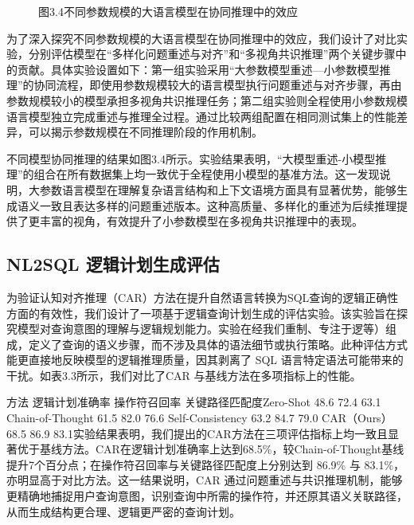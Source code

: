 \documentclass[12pt,a4paper,openright,UTF8]{ctexbook}
\begin{document}
\begin{figure}[htbp]
\centering
{}
\caption{图3.4不同参数规模的大语言模型在协同推理中的效应}
\end{figure}

为了深入探究不同参数规模的大语言模型在协同推理中的效应，我们设计了对比实验，分别评估模型在“多样化问题重述与对齐”和“多视角共识推理”两个关键步骤中的贡献。具体实验设置如下：第一组实验采用“大参数模型重述—小参数模型推理”的协同流程，即使用参数规模较大的语言模型执行问题重述与对齐步骤，再由参数规模较小的模型承担多视角共识推理任务；第二组实验则全程使用小参数规模语言模型独立完成重述与推理全过程。通过比较两组配置在相同测试集上的性能差异，可以揭示参数规模在不同推理阶段的作用机制。


不同模型协同推理的结果如图3.4所示。实验结果表明，“大模型重述-小模型推理”的组合在所有数据集上均一致优于全程使用小模型的基准方法。这一发现说明，大参数语言模型在理解复杂语言结构和上下文语境方面具有显著优势，能够生成语义一致且表达多样的问题重述版本。这种高质量、多样化的重述为后续推理提供了更丰富的视角，有效提升了小参数模型在多视角共识推理中的表现。

\subsection{NL2SQL 逻辑计划生成评估}

为验证认知对齐推理（CAR）方法在提升自然语言转换为SQL查询的逻辑正确性方面的有效性，我们设计了一项基于逻辑查询计划生成的评估实验。该实验旨在探究模型对查询意图的理解与逻辑规划能力。实验在经我们重制、专注于逻等）组成，定义了查询的语义步骤，而不涉及具体的语法细节或执行策略。此种评估方式能更直接地反映模型的逻辑推理质量，因其剥离了 SQL 语言特定语法可能带来的干扰。如表3.3所示，我们对比了CAR 与基线方法在多项指标上的性能。

\begin{table}[htbp]
\centering
\caption{表3.3不同方法在逻辑查询计划生成任务上的性能对比}
\end{table}

方法 逻辑计划准确率 操作符召回率 关键路径匹配度Zero-Shot 48.6 72.4 63.1 Chain-of-Thought 61.5 82.0 76.6 Self-Consistency 63.2 84.7 79.0 CAR（Ours） 68.5 86.9 83.1实验结果表明，我们提出的CAR方法在三项评估指标上均一致且显著优于基线方法。CAR在逻辑计划准确率上达到68.5\%，较Chain-of-Thought基线提升7个百分点；在操作符召回率与关键路径匹配度上分别达到 86.9\% 与 83.1\%，亦明显高于对比方法。这一结果说明，CAR 通过问题重述与共识推理机制，能够更精确地捕捉用户查询意图，识别查询中所需的操作符，并还原其语义关联路径，从而生成结构更合理、逻辑更严密的查询计划。
\end{document}
